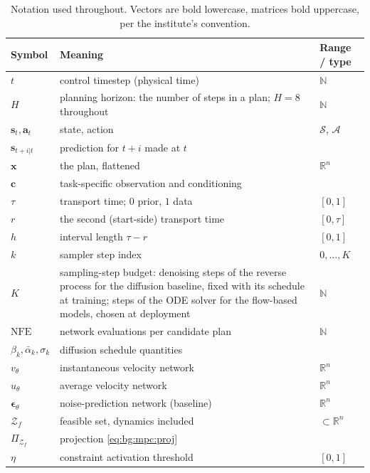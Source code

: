 \documentclass[headsepline,footsepline,footinclude=false,oneside,fontsize=11pt,paper=a4,listof=totoc,bibliography=totoc]{scrbook}
\theoremstyle{definition}
\theoremstyle{plain}
\theoremstyle{remark}
\newcommand{\vect}[1]{\boldsymbol{#1}}
\newcommand{\R}{\mathbb{R}}                    %
\newcommand{\proj}[1]{\Pi_{#1}}                %
\newcommand{\vfield}{v}                        %
\newcommand{\afield}{u}                        %
\newcommand{\ftime}{\tau}                      %
\newcommand{\nfe}{K}                           %
\begin{document}
\begin{table}[htpb]
  \caption[Notation]{Notation used throughout. Vectors are bold lowercase, matrices bold
  uppercase, per the institute's convention.}
  \centering
  \label{tab:notation}
  \begin{tabularx}{\linewidth}{lLl}
    \toprule
    Symbol & Meaning & Range / type \\
    \midrule
    $t$ & control timestep (physical time) & $\mathbb{N}$ \\
    $H$ & planning horizon: the number of steps in a plan; $H=8$ throughout & $\mathbb{N}$ \\
    $\vect{s}_{t},\vect{a}_{t}$ & state, action & $\mathcal{S}$, $\mathcal{A}$ \\
    $\vect{s}_{t+i|t}$ & prediction for $t+i$ made at $t$ & \\
    $\vect{x}$ & the plan, flattened & $\R^{n}$ \\
    $\vect{c}$ & task-specific observation and conditioning & \\
    $\ftime$ & transport time; $0$ prior, $1$ data & $[0,1]$ \\
    $r$ & the second (start-side) transport time & $[0,\ftime]$ \\
    $h$ & interval length $\ftime-r$ & $[0,1]$ \\
    $k$ & sampler step index & $0,\dots,\nfe$ \\
    $\nfe$ & sampling-step budget: denoising steps of the reverse process
      for the diffusion baseline, fixed with its schedule at training; steps of the \ac{ODE} solver
      for the flow-based models, chosen at deployment & $\mathbb{N}$ \\
    $\mathrm{NFE}$ & network evaluations per candidate plan & $\mathbb{N}$ \\
    $\beta_{k},\bar{\alpha}_{k},\sigma_{k}$ & diffusion schedule quantities & \\
    $\vfield_{\theta}$ & instantaneous velocity network & $\R^{n}$ \\
    $\afield_{\theta}$ & average velocity network & $\R^{n}$ \\
    $\vect{\epsilon}_{\theta}$ & noise-prediction network (baseline) & $\R^{n}$ \\
    $\mathcal{Z}_{f}$ & feasible set, dynamics included & $\subset\R^{n}$ \\
    $\proj{\mathcal{Z}_{f}}$ & projection \eqref{eq:bg:mpc:proj} & \\
    $\eta$ & constraint activation threshold & $[0,1]$ \\

\end{tabularx}
\end{table}
\end{document}
